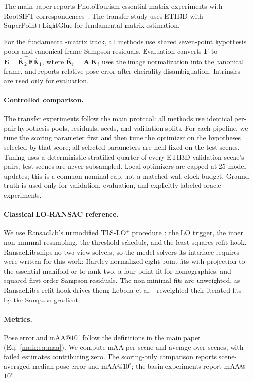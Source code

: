 \documentclass[runningheads]{llncs}
\begin{document}
The main paper reports PhotoTourism essential-matrix experiments with
RootSIFT correspondences~\cite{Jin2021}. The transfer study uses ETH3D
\cite{Schoeps2017} with SuperPoint+LightGlue
\cite{DeTone2018,Lindenberger2023} for fundamental-matrix estimation.

For the fundamental-matrix track, all methods use shared seven-point
hypothesis pools and canonical-frame Sampson residuals. Evaluation converts
$\mathbf F$ to $\mathbf E=\bar{\mathbf K}_2^\top\mathbf F\bar{\mathbf K}_1$,
where $\bar{\mathbf K}_i=\mathbf A_i\mathbf K_i$ uses the image normalization
into the canonical frame, and reports relative-pose error after cheirality
disambiguation. Intrinsics are used only for evaluation.

\paragraph{Controlled comparison.}
The transfer experiments follow the main protocol: all methods use identical
per-pair hypothesis pools, residuals, seeds, and validation splits. For each
pipeline, we tune the scoring parameter first and then tune the optimizer on
the hypotheses selected by that score; all selected parameters are held fixed
on the test scenes. Tuning uses a deterministic stratified quarter of every ETH3D
validation scene's pairs; test scenes are never subsampled.
Local optimizers are capped at 25 model updates;
this is a common nominal cap, not a matched wall-clock budget. Ground truth is
used only for validation, evaluation, and explicitly labeled oracle
experiments.

\paragraph{Classical LO-RANSAC reference.}
We use RansacLib's unmodified TLS-LO$^+$ procedure~\cite{Sattler2019Github}:
the LO trigger, the inner non-minimal
resampling, the threshold schedule, and the least-squares refit hook. RansacLib
ships no two-view solvers, so the model solvers its interface requires were
written for this work: Hartley-normalized eight-point fits with projection to
the essential manifold or to rank two, a four-point fit for homographies, and
squared first-order Sampson residuals. The non-minimal fits are unweighted, as
RansacLib's refit hook drives them; Lebeda et al.~\cite{Lebeda2012} reweighted
their iterated fits by the Sampson gradient.

\paragraph{Metrics.}
Pose error and mAA@$10^\circ$ follow the definitions in the main paper
(Eq.~\ref{main:eq:maa}). We compute mAA per scene and average over scenes, with
failed estimates contributing zero. The scoring-only comparison reports
scene-averaged median pose error and mAA@$10^\circ$; the basin experiments
report mAA@$10^\circ$.
\end{document}
